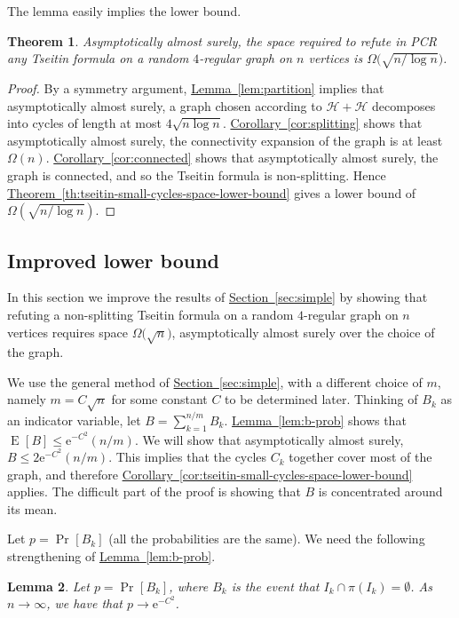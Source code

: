 \documentclass[11pt]{article}
\numberwithin{equation}{section}
\newtheorem{theorem}{Theorem}[section]
\newtheorem{lemma}[theorem]{Lemma}
\theoremstyle{definition}
\theoremstyle{plain}
\newcommand{\eee}{\mathrm e}
\newcommand{\expref}[2]{\hyperref[#2]{#1~\ref{#2}}}
\theoremstyle{plain}
\theoremstyle{definition}
\newcommand{\Bigomega}[1]{\Omega \bigl( #1 \bigr)}
\newcommand{\bigomega}[1]{\Omega ( #1 )}
\DeclareMathOperator{\Expop}{E}
\newcommand{\prob}[2][]{\Pr_{#1} [ #2 ]}
\newcommand{\expectation}[2][]{\Expop_{#1} [ #2 ]}
\newcommand{\tends}{\longrightarrow}
\newcommand{\probspace}{\mathcal}
\newcommand{\psHam}{\probspace{H}}
\newcommand{\Gnonsplittingnot}{non-splitting\xspace}
\newcommand{\Gnonsplitting}{\Gnonsplittingnot}
\begin{document}
The lemma easily implies the lower bound.

\begin{theorem} \label{thm:simple}
 Asymptotically almost surely, the space required to refute in PCR any Tseitin formula on a random $4$-regular graph on $n$ vertices is $\Bigomega{\sqrt{n/\log n}}$.
\end{theorem}
\begin{proof}
 By a symmetry argument, \expref{Lemma}{lem:partition} implies that asymptotically almost surely, a graph chosen according to $\psHam + \psHam$ decomposes into cycles of %
 length at most $4\sqrt{n \log n}$. \expref{Corollary}{cor:splitting} shows that asymptotically almost surely, the connectivity expansion of the graph is at least $\bigomega{n}$. \expref{Corollary}{cor:connected} shows that asymptotically almost surely, the graph is connected, and so the Tseitin formula is \Gnonsplittingnot. Hence \expref{Theorem}{th:tseitin-small-cycles-space-lower-bound} gives a lower bound of $\Omega(\sqrt{n/\log n})$.
\end{proof}

\subsection{Improved lower bound} \label{sec:improved}

In this section we improve the results of \expref{Section}{sec:simple} by showing that refuting a \Gnonsplitting Tseitin formula on a random $4$-regular graph on $n$ vertices requires space $\Bigomega{\sqrt{n}}$, asymptotically almost surely over the choice of the graph.

We use the general method of \expref{Section}{sec:simple}, with a different choice of $m$, namely $m = C\sqrt{n}$ for some constant $C$ to be determined later. Thinking of $B_k$ as an indicator variable, let $B = \sum_{k=1}^{n/m} B_k$. \expref{Lemma}{lem:b-prob} shows that $\expectation{B} \leq \eee^{-C^2} (n/m)$. We will show that asymptotically almost surely, $B \leq 2\eee^{-C^2} (n/m)$. This implies that the cycles $C_k$ together cover most of the graph, and therefore \expref{Corollary}{cor:tseitin-small-cycles-space-lower-bound} applies. The difficult part of the proof is showing that $B$ is concentrated around its mean.

Let $p = \prob{B_k}$ (all the probabilities are the same). We need the following strengthening of \expref{Lemma}{lem:b-prob}.

\begin{lemma} \label{lem:b-prob-limit}
 Let $p = \prob{B_k}$, where $B_k$ is the event that $I_k \cap \pi(I_k) = \emptyset$. As $n \tends \infty$, we have that $p \tends \eee^{-C^2}$.
\end{lemma}
\end{document}
